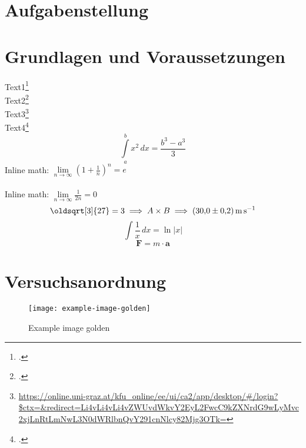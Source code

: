 \documentclass[ngerman]{scrartcl}
\renewcommand*{\sqrt}[2][\ ]{\oldsqrt[#1]{#2} }
\begin{document}


\clearpage
\tableofcontents
\newpage

\section{Aufgabenstellung}
\label{sec:aufgabenstellung}



\section{Grundlagen und Voraussetzungen}
\label{sec:grundlagen_voraussetzungen}

Text1\footcite[1000]{ref:dem1} \\
Text2\footcite[Kapitel 74]{ref:knoll} \\
Text3\footnote{\url{https://online.uni-graz.at/kfu_online/ee/ui/ca2/app/desktop/\#/login?$ctx=&redirect=Li4vLi4vLi4vZWUvdWkvY2EyL2FwcC9kZXNrdG9wLyMvc2xjLnRtLmNwL3N0dWRlbnQvY291cnNlcy82Mjg3OTk=}} \\  %
Text4\footcite{ref:genol2013}
%
\begin{equation}
    \label{eq:grenzen-oben-unten}
    \int \limits_{a}^{b} x^2 \, dx =\frac{b^3-a^3}{3}  %
\end{equation}
%
Inline math: \(\lim \limits_{n \to \infty} \left( 1 + \frac{1}{n} \right) ^{n} = e\)  \\ \\ %
Inline math: $\lim \limits_{n \to \infty} \frac{1}{2n} = 0$  %
%
\begin{displaymath}
    \sqrt[3]{27} = 3 \implies A \times B \implies \SI{30.0(2)}{\meter\per\second}
\end{displaymath}
%
\[ \int \frac{1}{x} \, dx = \ln|x| \]  %
$$ \textbf{F} = m \cdot \textbf{a} $$  %



\section{Versuchsanordnung}
\label{sec:versuchsanordnung}

\begin{figure}[H]
    \centering
    \begin{samepage}
        \texttt{[image: example-image-golden]}
        \caption{Example image golden}
        \label{fig:example-image-golden}
    \end{samepage}
\end{figure}
\end{document}
